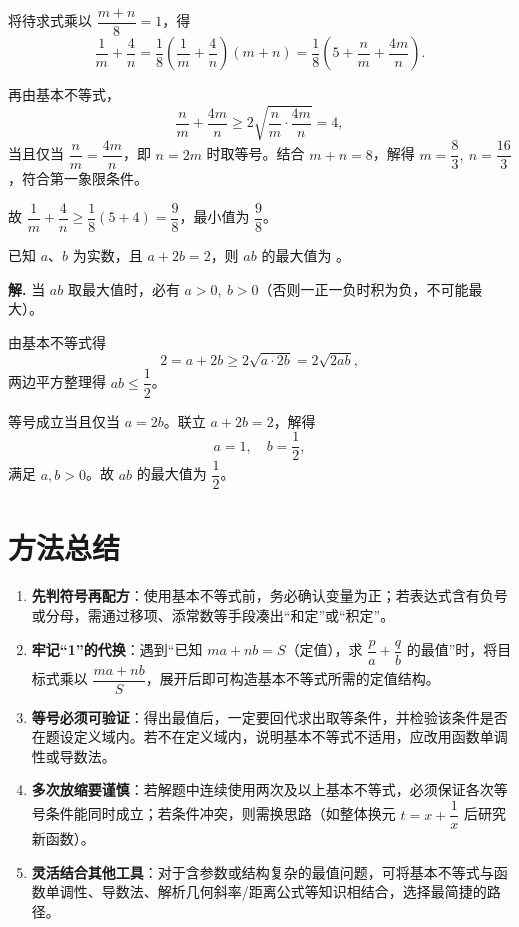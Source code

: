 \documentclass[11pt]{ctexrep}
\begin{document}
将待求式乘以 $\dfrac{m + n}{8} = 1$，得
\[
    \frac{1}{m} + \frac{4}{n}
    = \frac{1}{8}\left( \frac{1}{m} + \frac{4}{n} \right)(m + n)
    = \frac{1}{8}\left( 5 + \frac{n}{m} + \frac{4m}{n} \right).
\]

再由基本不等式，
\[
    \frac{n}{m} + \frac{4m}{n} \ge 2\sqrt{\frac{n}{m} \cdot \frac{4m}{n}} = 4,
\]
当且仅当 $\dfrac{n}{m} = \dfrac{4m}{n}$，即 $n = 2m$ 时取等号。结合 $m + n = 8$，解得 $m = \dfrac{8}{3},\ n = \dfrac{16}{3}$，符合第一象限条件。

故 $\dfrac{1}{m} + \dfrac{4}{n} \ge \dfrac{1}{8}(5 + 4) = \dfrac{9}{8}$，最小值为 $\dfrac{9}{8}$。

\begin{realexam}[2025.12 浦东高三一模]
    已知 $a$、$b$ 为实数，且 $a + 2b = 2$，则 $ab$ 的最大值为 \underline{\hspace{2cm}}。
\end{realexam}

\textbf{解.} 当 $ab$ 取最大值时，必有 $a > 0,\ b > 0$（否则一正一负时积为负，不可能最大）。

由基本不等式得
\[
    2 = a + 2b \ge 2\sqrt{a \cdot 2b} = 2\sqrt{2ab},
\]
两边平方整理得 $ab \le \dfrac{1}{2}$。

等号成立当且仅当 $a = 2b$。联立 $a + 2b = 2$，解得
\[
    a = 1,\quad b = \frac{1}{2},
\]
满足 $a, b > 0$。故 $ab$ 的最大值为 $\dfrac{1}{2}$。

\section*{方法总结}

\begin{enumerate}
    \item \textbf{先判符号再配方}：使用基本不等式前，务必确认变量为正；若表达式含有负号或分母，需通过移项、添常数等手段凑出“和定”或“积定”。
    \item \textbf{牢记“1”的代换}：遇到“已知 $ma + nb = S$（定值），求 $\dfrac{p}{a} + \dfrac{q}{b}$ 的最值”时，将目标式乘以 $\dfrac{ma + nb}{S}$，展开后即可构造基本不等式所需的定值结构。
    \item \textbf{等号必须可验证}：得出最值后，一定要回代求出取等条件，并检验该条件是否在题设定义域内。若不在定义域内，说明基本不等式不适用，应改用函数单调性或导数法。
    \item \textbf{多次放缩要谨慎}：若解题中连续使用两次及以上基本不等式，必须保证各次等号条件能同时成立；若条件冲突，则需换思路（如整体换元 $t = x + \dfrac{1}{x}$ 后研究新函数）。
    \item \textbf{灵活结合其他工具}：对于含参数或结构复杂的最值问题，可将基本不等式与函数单调性、导数法、解析几何斜率/距离公式等知识相结合，选择最简捷的路径。
\end{enumerate}
\end{document}

